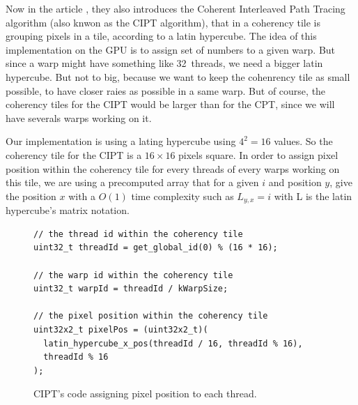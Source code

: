 \label{subsec:cipt}
Now in the article \cite{cpt}, they also introduces the Coherent Interleaved Path
Tracing algorithm (also knwon as the CIPT algorithm), that in a coherency tile
is grouping pixels in a tile, according to a
latin hypercube. The idea of this implementation on the GPU is to assign set of
numbers to a given warp. But since a warp might have something like 32~threads,
we need a bigger latin hypercube. But not to big, because we want to keep the
cohenrency tile as small possible, to have closer raies as possible in a same
warp. But of course, the coherency tiles for the CIPT would be larger than for
the CPT, since we will have severals warps working on it.

Our implementation is using a lating hypercube using $4^2 = 16$ values. So the
coherency tile for the CIPT is a $16 \times 16$ pixels square. In order to assign
pixel position within the coherency tile for every threads of every warps
working on this tile, we are using a precomputed array that for a given $i$ and
position $y$, give the position $x$ with a $O(1)$ time complexity such as
$L_{y,x} = i$ with L is the latin hypercube's matrix notation.
\begin{figure}[H]
    \centering
    \begin{lstlisting}[morekeywords={uint32_t,uint32x2_t,get_global_id}]
// the thread id within the coherency tile
uint32_t threadId = get_global_id(0) % (16 * 16);

// the warp id within the coherency tile
uint32_t warpId = threadId / kWarpSize;

// the pixel position within the coherency tile
uint32x2_t pixelPos = (uint32x2_t)(
  latin_hypercube_x_pos(threadId / 16, threadId % 16),
  threadId % 16
);
    \end{lstlisting}
    \caption{CIPT's code assigning pixel position to each thread.}
    \label{code:cipt_pixel_pos}
\end{figure}

